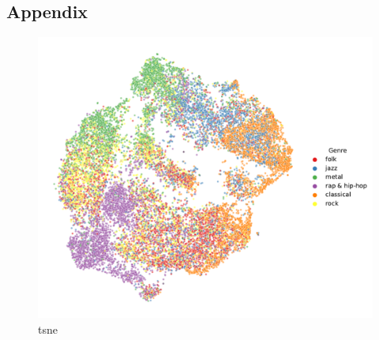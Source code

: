 \documentclass{article}
\begin{document}


\begin{appendix}
\section{Appendix}

\newpage

\begin{figure}
  \centering
  \includegraphics[width=1.0\textwidth]{../figures/tsne_genres.pdf}
  \caption{tsne}
  \label{fig:tsne_genres}
\end{figure}

\end{appendix}
\end{document}
